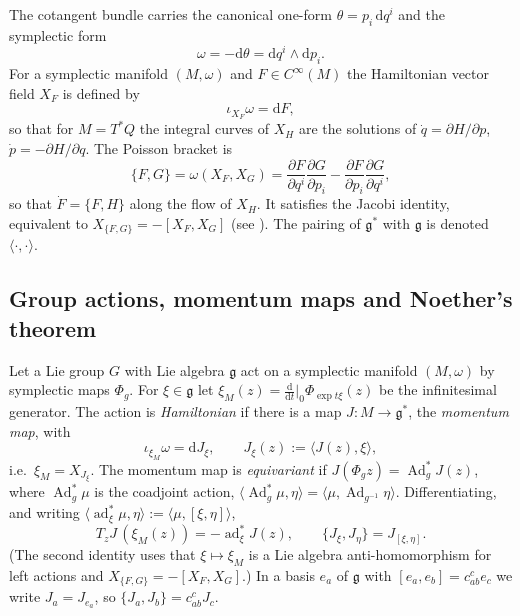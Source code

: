 \documentclass[11pt,a4paper]{article}
\numberwithin{equation}{section}
\theoremstyle{plain}
\theoremstyle{definition}
\theoremstyle{remark}
\newcommand{\frakg}{\mathfrak{g}}
\newcommand{\Ad}{\operatorname{Ad}}
\newcommand{\ad}{\operatorname{ad}}
\newcommand{\pb}[2]{\{#1,#2\}}
\newcommand{\pair}[2]{\langle #1,#2\rangle}
\newcommand{\dd}{\mathrm{d}}
\newcommand{\inv}{^{-1}}
\begin{document}
The cotangent bundle carries the canonical one-form $\theta=p_i\,\dd q^i$ and the symplectic form
\begin{equation}\label{eq:omega}
\omega=-\dd\theta=\dd q^i\wedge\dd p_i .
\end{equation}
For a symplectic manifold $(M,\omega)$ and $F\in C^\infty(M)$ the Hamiltonian vector field $X_F$ is defined by
\begin{equation}\label{eq:XH}
\iota_{X_F}\omega=\dd F,
\end{equation}
so that for $M=T^*Q$ the integral curves of $X_H$ are the solutions of $\dot q=\partial H/\partial p$, $\dot p=-\partial H/\partial q$. The Poisson bracket is
\begin{equation}\label{eq:PB}
\pb FG=\omega(X_F,X_G)=\frac{\partial F}{\partial q^i}\frac{\partial G}{\partial p_i}-\frac{\partial F}{\partial p_i}\frac{\partial G}{\partial q^i},
\end{equation}
so that $\dot F=\pb FH$ along the flow of $X_H$. It satisfies the Jacobi identity, equivalent to $X_{\pb FG}=-[X_F,X_G]$ (see \cite{am1978,mr1999}). The pairing of $\frakg^*$ with $\frakg$ is denoted $\pair\cdot\cdot$.

\subsection{Group actions, momentum maps and Noether's theorem}\label{sec:momap}

Let a Lie group $G$ with Lie algebra $\frakg$ act on a symplectic manifold $(M,\omega)$ by symplectic maps $\Phi_g$. For $\xi\in\frakg$ let $\xi_M(z)=\frac{\dd}{\dd t}\big|_{0}\Phi_{\exp t\xi}(z)$ be the infinitesimal generator. The action is \emph{Hamiltonian} if there is a map $J:M\to\frakg^*$, the \emph{momentum map}, with
\begin{equation}\label{eq:momap}
\iota_{\xi_M}\omega=\dd J_\xi,\qquad J_\xi(z):=\pair{J(z)}{\xi},
\end{equation}
i.e.\ $\xi_M=X_{J_\xi}$. The momentum map is \emph{equivariant} if $J(\Phi_g z)=\Ad^*_g J(z)$, where $\Ad^*_g\mu$ is the coadjoint action, $\pair{\Ad^*_g\mu}{\eta}=\pair\mu{\Ad_{g\inv}\eta}$. Differentiating, and writing $\pair{\ad^*_\xi\mu}{\eta}:=\pair\mu{[\xi,\eta]}$,
\begin{equation}\label{eq:TJ}
T_zJ\,(\xi_M(z))=-\ad^*_\xi J(z),\qquad
\pb{J_\xi}{J_\eta}=J_{[\xi,\eta]} .
\end{equation}
(The second identity uses that $\xi\mapsto\xi_M$ is a Lie algebra anti-homomorphism for left actions and $X_{\pb FG}=-[X_F,X_G]$.) In a basis $e_a$ of $\frakg$ with $[e_a,e_b]=c^c_{ab}e_c$ we write $J_a=J_{e_a}$, so $\pb{J_a}{J_b}=c^c_{ab}J_c$.
\end{document}
